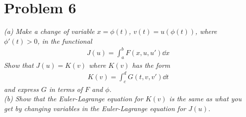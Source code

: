 \documentclass[12pt]{article}
\theoremstyle{plain}
\begin{document}
\section*{Problem 6}
\textit{(a) Make a change of variable $x = \phi(t)$, $v(t) = u(\phi(t))$, where $\phi'(t) > 0$, in the functional}
\begin{align*}
    J(u) = \int_a^b F(x, u, u')\dd x
\end{align*}
\textit{Show that $J(u) = K(v)$ where $K(v)$ has the form}
\begin{align*}
    K(v) = \int_c^d G(t, v, v')\dd t
\end{align*}
\textit{and express $G$ in terms of $F$ and $\phi$.\\
(b) Show that the Euler-Lagrange equation for $K(v)$ is the same as what you get by changing variables in the Euler-Lagrange equation for $J(u)$.}
\end{document}
